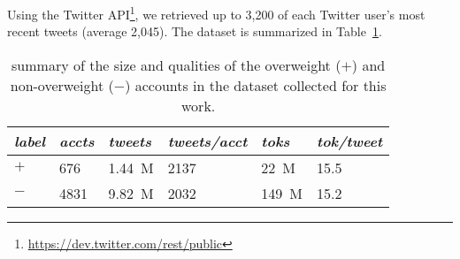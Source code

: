 Using the Twitter API\footnote{\url{https://dev.twitter.com/rest/public}}, we retrieved up to 3,200 of each Twitter user's most recent tweets (average 2,045).
The dataset is summarized in Table~\ref{tab:data}.

\begin{table}
\centering\small
\begin{tabular}{@{}l l l l l l@{}}
\toprule
\textit{label} 	& \textit{accts}	& \textit{tweets}	& \textit{tweets/acct}	& \textit{toks}	& \textit{tok/tweet}	\\ 
\midrule
$+$	& 676	& 1.44~M	& 2137	& 22~M	& 15.5	\\
$-$	& 4831	& 9.82~M	& 2032	& 149~M	& 15.2	\\
\bottomrule
\end{tabular}
\caption{{\small summary of the size and qualities of the overweight ($+$) and non-overweight ($-$) accounts in the dataset collected for this work.}}
\label{tab:data}
\vspace{-3mm}
\end{table}
 
